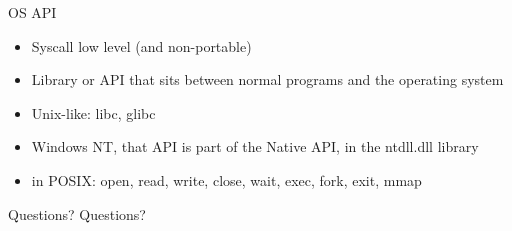 \documentclass{beamer}
\begin{document}
\begin{frame}{OS API}
    \begin{itemize}
    \item Syscall low level (and non-portable)
    \item Library or API that sits between normal programs and the
      operating system 
    \item Unix-like: libc, glibc
    \item Windows NT, that API is part of the Native API, in the
      ntdll.dll library
    \item in POSIX: open, read, write, close, wait, exec, fork, exit, mmap
    \end{itemize}
\end{frame}


\begin{frame}{Questions?}
    Questions?
\end{frame}
\end{document}
